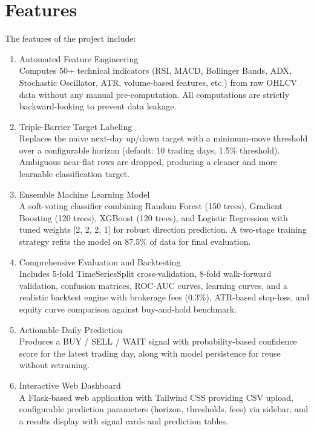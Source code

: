 \documentclass[12pt, a4paper]{report}
\begin{document}
	\section{Features}
	The features of the project include:
	\begin{enumerate}
		\renewcommand{\labelenumi}{\roman{enumi}.}
		\item Automated Feature Engineering\\
		Computes 50+ technical indicators (RSI, MACD, Bollinger Bands, ADX, Stochastic Oscillator, ATR, volume-based features, etc.) from raw OHLCV data without any manual pre-computation. All computations are strictly backward-looking to prevent data leakage.
		\item Triple-Barrier Target Labeling\\
		Replaces the naive next-day up/down target with a minimum-move threshold over a configurable horizon (default: 10 trading days, 1.5\% threshold). Ambiguous near-flat rows are dropped, producing a cleaner and more learnable classification target.
		\item Ensemble Machine Learning Model\\
		A soft-voting classifier combining Random Forest (150 trees), Gradient Boosting (120 trees), XGBoost (120 trees), and Logistic Regression with tuned weights [2, 2, 2, 1] for robust direction prediction. A two-stage training strategy refits the model on 87.5\% of data for final evaluation.
		\item Comprehensive Evaluation and Backtesting\\
		Includes 5-fold TimeSeriesSplit cross-validation, 8-fold walk-forward validation, confusion matrices, ROC-AUC curves, learning curves, and a realistic backtest engine with brokerage fees (0.3\%), ATR-based stop-loss, and equity curve comparison against buy-and-hold benchmark.
		\item Actionable Daily Prediction\\
		Produces a BUY / SELL / WAIT signal with probability-based confidence score for the latest trading day, along with model persistence for reuse without retraining.
		\item Interactive Web Dashboard\\
		A Flask-based web application with Tailwind CSS providing CSV upload, configurable prediction parameters (horizon, thresholds, fees) via sidebar, and a results display with signal cards and prediction tables.
	\end{enumerate}
	
\end{document}
